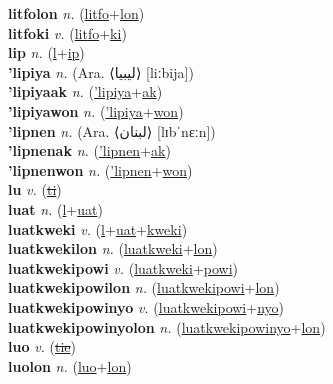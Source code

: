 \textbf{litfolon} \textit{n.} (\hyperref[litfo]{litfo}+\hyperref[lon]{lon})
 \label{litfolon} \\
\textbf{litfoki} \textit{v.} (\hyperref[litfo]{litfo}+\hyperref[ki]{ki})
 \label{litfoki} \\
\textbf{lip} \textit{n.} (\hyperref[l]{l}+\hyperref[ip]{ip})
 \label{lip} \\
\textbf{'lipiya} \textit{n.} (Ara. ⟨ليبيا‎⟩ [liːbija])
 \label{'lipiya} \\
\textbf{'lipiyaak} \textit{n.} (\hyperref['lipiya]{'lipiya}+\hyperref[ak]{ak})
 \label{'lipiyaak} \\
\textbf{'lipiyawon} \textit{n.} (\hyperref['lipiya]{'lipiya}+\hyperref[won]{won})
 \label{'lipiyawon} \\
\textbf{'lipnen} \textit{n.} (Ara. ⟨لبنان‎⟩ [lɪbˈnɛːn])
 \label{'lipnen} \\
\textbf{'lipnenak} \textit{n.} (\hyperref['lipnen]{'lipnen}+\hyperref[ak]{ak})
 \label{'lipnenak} \\
\textbf{'lipnenwon} \textit{n.} (\hyperref['lipnen]{'lipnen}+\hyperref[won]{won})
 \label{'lipnenwon} \\
\textbf{lu} \textit{v.} (\hyperref[ti]{\sout{ti}})
 \label{lu} \\
\textbf{luat} \textit{n.} (\hyperref[l]{l}+\hyperref[uat]{uat})
 \label{luat} \\
\textbf{luatkweki} \textit{v.} (\hyperref[l]{l}+\hyperref[uat]{uat}+\hyperref[kweki]{kweki})
 \label{luatkweki} \\
\textbf{luatkwekilon} \textit{n.} (\hyperref[luatkweki]{luatkweki}+\hyperref[lon]{lon})
 \label{luatkwekilon} \\
\textbf{luatkwekipowi} \textit{v.} (\hyperref[luatkweki]{luatkweki}+\hyperref[powi]{powi})
 \label{luatkwekipowi} \\
\textbf{luatkwekipowilon} \textit{n.} (\hyperref[luatkwekipowi]{luatkwekipowi}+\hyperref[lon]{lon})
 \label{luatkwekipowilon} \\
\textbf{luatkwekipowinyo} \textit{v.} (\hyperref[luatkwekipowi]{luatkwekipowi}+\hyperref[nyo]{nyo})
 \label{luatkwekipowinyo} \\
\textbf{luatkwekipowinyolon} \textit{n.} (\hyperref[luatkwekipowinyo]{luatkwekipowinyo}+\hyperref[lon]{lon})
 \label{luatkwekipowinyolon} \\
\textbf{luo} \textit{v.} (\hyperref[tie]{\sout{tie}})
 \label{luo} \\
\textbf{luolon} \textit{n.} (\hyperref[luo]{luo}+\hyperref[lon]{lon})
 \label{luolon} \\
